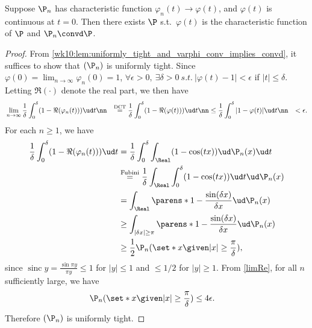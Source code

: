 \documentclass[../aipt.tex]{subfiles}
\begin{document}
\begin{Theorem}\label{wk10:thm:Levy's Continuity Theorem}
Suppose $\P_n$ has characteristic function $\varphi_n(t)\to \varphi(t)$, and $\varphi(t)$ is continuous at $t=0$. Then there exists $\P$ s.t.\ $\varphi(t)$ is the characteristic function of $\P$ and $\P_n\convd \P$.
\end{Theorem}
\begin{proof}
From \cref{wk10:lem:uniformly_tight_and_varphi_conv_implies_convd}, it suffices to show that $(\P_n)$ is uniformly tight. Since $\varphi(0) =\lim_{n\to \infty} \varphi_n(0)=1$, $\forall \epsilon >0,\ \exists \delta>0 \ s.t.\ |\varphi(t)-1|<\epsilon$ if $|t|\leq\delta$. Letting $\Re(\cdot)$ denote the real part, we then have
\begin{align}
& \lim_{n\to \infty} \frac{1}{\delta} \int _{0}^{\delta} (1-\Re(\varphi_n(t))) \ud t\nn
& \overset{\text{DCT}}{=} \frac{1}{\delta} \int _{0}^{\delta} (1-\Re(\varphi(t))) \ud t\nn
& \leq \frac{1}{\delta} \int _{0}^{\delta} |1-\varphi(t)| \ud t\nn
& <\epsilon.\label{limRe}
\end{align}
For each $n\geq1$, we have
\begin{align*}
\frac{1}{\delta} \int _{0}^{\delta} (1-\Re (\varphi_n(t))) \ud t 	
&=\frac{1}{\delta} \int _{0}^{\delta} \int_{\Real} (1-\cos(tx)) \ud \P_n(x) \ud t\\
&\overset{\text{Fubini}}{=}  \frac{1}{\delta}  \int_{\Real} \int _{0}^{\delta} (1-\cos(tx)) \ud t \ud \P_n(x) \\
& = \int _{\Real}\parens*{1-\frac{\sin (\delta x)}{\delta x}} \ud \P_n(x)\\
& \geq \int_{|\delta x|\geq \pi}\parens*{1-\frac{\sin (\delta x)}{\delta x}} \ud \P_n(x)\\
& \geq \frac{1}{2} \P_n(\set*{x\given |x| \geq \frac{\pi}{\delta}}),
\end{align*}
since $\operatorname{sinc} y = \frac{\sin \pi y}{\pi y} \leq 1$ for $|y| \leq 1$ and $\leq 1/2$ for $|y| \geq 1$. From \cref{limRe}, for all $n$ sufficiently large, we have
\begin{align*}
& \P_n(\set*{x\given |x| \geq \frac{\pi}{\delta}}) \leq 4 \epsilon.
\end{align*}
Therefore $(\P_n)$ is uniformly tight.
\end{proof}
\end{document}
